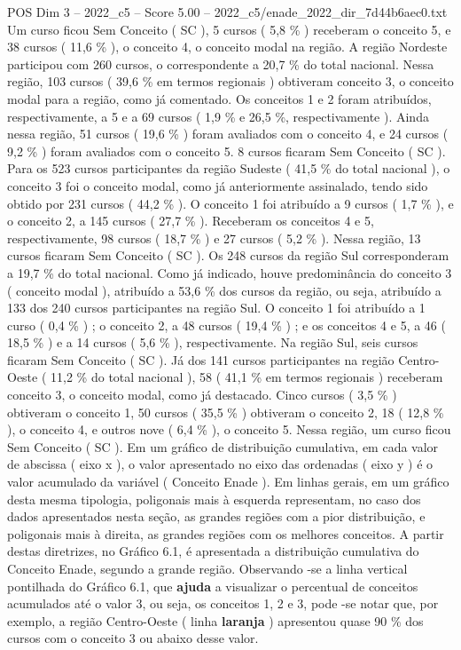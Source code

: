 \begin{textsample}{POS Dim 3 – 2022\_c5 – Score 5.00 – 2022\_c5/enade\_2022\_dir\_7d44b6aec0.txt}
Um curso ficou Sem Conceito ( SC ), 5 cursos ( 5,8 \% ) receberam o conceito 5, e 38 cursos ( 11,6 \% ), o conceito 4, o conceito modal na região.
A região Nordeste participou com 260 cursos, o correspondente a 20,7 \% do total nacional.
Nessa região, 103 cursos ( 39,6 \% em termos regionais ) obtiveram conceito 3, o conceito modal para a região, como já comentado.
Os conceitos 1 e 2 foram atribuídos, respectivamente, a 5 e a 69 cursos ( 1,9 \% e 26,5 \%, respectivamente ).
Ainda nessa região, 51 cursos ( 19,6 \% ) foram avaliados com o conceito 4, e 24 cursos ( 9,2 \% ) foram avaliados com o conceito 5. 8 cursos ficaram Sem Conceito ( SC ).
Para os 523 cursos participantes da região Sudeste ( 41,5 \% do total nacional ), o conceito 3 foi o conceito modal, como já anteriormente assinalado, tendo sido obtido por 231 cursos ( 44,2 \% ).
O conceito 1 foi atribuído a 9 cursos ( 1,7 \% ), e o conceito 2, a 145 cursos ( 27,7 \% ).
Receberam os conceitos 4 e 5, respectivamente, 98 cursos ( 18,7 \% ) e 27 cursos ( 5,2 \% ).
Nessa região, 13 cursos ficaram Sem Conceito ( SC ).
Os 248 cursos da região Sul corresponderam a 19,7 \% do total nacional.
Como já indicado, houve predominância do conceito 3 ( conceito modal ), atribuído a 53,6 \% dos cursos da região, ou seja, atribuído a 133 dos 240 cursos participantes na região Sul.
O conceito 1 foi atribuído a 1 curso ( 0,4 \% ) ; o conceito 2, a 48 cursos ( 19,4 \% ) ; e os conceitos 4 e 5, a 46 ( 18,5 \% ) e a 14 cursos ( 5,6 \% ), respectivamente.
Na região Sul, seis cursos ficaram Sem Conceito ( SC ).
Já dos 141 cursos participantes na região Centro-Oeste ( 11,2 \% do total nacional ), 58 ( 41,1 \% em termos regionais ) receberam conceito 3, o conceito modal, como já destacado.
Cinco cursos ( 3,5 \% ) obtiveram o conceito 1, 50 cursos ( 35,5 \% ) obtiveram o conceito 2, 18 ( 12,8 \% ), o conceito 4, e outros nove ( 6,4 \% ), o conceito 5.
Nessa região, um curso ficou Sem Conceito ( SC ).
Em um gráfico de distribuição cumulativa, em cada valor de abscissa ( eixo x ), o valor apresentado no eixo das ordenadas ( eixo y ) é o valor acumulado da variável ( Conceito Enade ).
Em linhas gerais, em um gráfico desta mesma tipologia, poligonais mais à esquerda representam, no caso dos dados apresentados nesta seção, as grandes regiões com a pior distribuição, e poligonais mais à direita, as grandes regiões com os melhores conceitos.
A partir destas diretrizes, no Gráfico 6.1, é apresentada a distribuição cumulativa do Conceito Enade, segundo a grande região.
Observando -se a linha vertical pontilhada do Gráfico 6.1, que \textbf{ajuda} a visualizar o percentual de conceitos acumulados até o valor 3, ou seja, os conceitos 1, 2 e 3, pode -se notar que, por exemplo, a região Centro-Oeste ( linha \textbf{laranja} ) apresentou quase 90 \% dos cursos com o conceito 3 ou abaixo desse valor.

\end{textsample}
